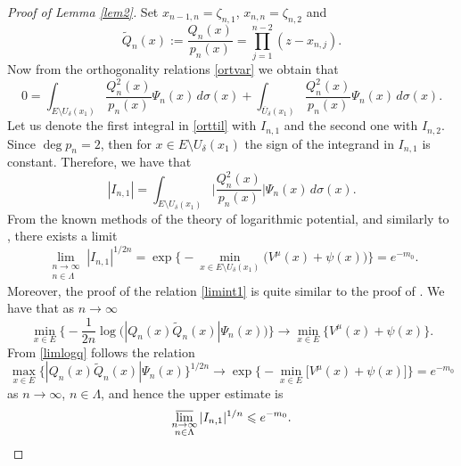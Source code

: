 \documentclass[11pt, a4paper, twoside]{article}
\let\leq\leqslant
\let\myt\widetilde
\let\myo\overline
\def\mdeg{\operatorname{deg}}
\theoremstyle{plain}
\theoremstyle{definition}
\begin{document}
\begin{proof}[Proof of Lemma \ref{lem2}]
Set $x_{n-1,n}=\zeta_{n,1}$, $x_{n,n}=\zeta_{n,2}$ and
\begin{equation}
\myt{Q}_n(x):=\frac{Q_{n}(x)}{p_n(x)}=\prod_{j=1}^{n-2}(z-x_{n,j}).
\label{qtilde}
\end{equation}
Now from the orthogonality relations \eqref{ortvar} we obtain that
\begin{equation}
0=\int_{E\setminus{U_\delta(x_1)}}
\frac{Q_{n}^2(x)}{p_n(x)}\Psi_n(x)\,d\sigma(x)
+\int_{\myo{U}_\delta(x_1)}
\frac{Q_{n}^2(x)}{p_n(x)}\Psi_n(x)\,d\sigma(x).
\label{orttil}
\end{equation}
Let us denote the first integral in \eqref{orttil} with $I_{n,1}$ and the second one with $I_{n,2}$. Since $\mdeg{p_n}=2$, then for $x\in E\setminus{U_\delta(x_1)}$ the sign of  the integrand in $I_{n,1}$  is constant. Therefore, we have that 
\begin{equation}
|I_{n,1}|=\int_{E\setminus{U_\delta(x_1)}}\biggl|
\frac{Q_{n}^2(x)}{p_n(x)}\biggr|\Psi_n(x)\,d\sigma(x).
\label{ortint1}
\end{equation}
From the known methods of the theory of logarithmic potential, and similarly to \cite[Lemma 7]{GoRa87}, there exists a limit 
\begin{equation}
\lim_{\substack{n\to\infty\\n\in\Lambda}} |I_{n,1}|^{1/2n}
=\exp\biggl\{
-\min_{x\in E\setminus{U_\delta(x_1)}}\bigl(V^\mu(x)+\psi(x)
\bigr)\biggr\}
=e^{-m_0}.
\label{limint1}
\end{equation}
Moreover, the proof of the relation \eqref{limint1} is quite similar  to the proof of \cite[Lemma 7]{GoRa87}. We have that as $n\to\infty$
\begin{equation}
\min_{x\in E}\biggl\{-\frac1{2n}
\log\bigl(
|Q_{n}(x)\myt{Q}_n(x)|\Psi_n(x)\bigr)\biggr\}
\to\min_{x\in E} \bigl\{V^\mu(x)+\psi(x)\bigr\}.
\label{limlogq}
\end{equation}
From \eqref{limlogq} follows the relation
\begin{equation}
\max_{x\in E}\bigl\{|Q_{n}(x)\myt{Q}_n(x)|\Psi_n(x)
\bigr\}^{1/2n}\to\exp\bigl\{-\min_{x\in E}\bigl[V^\mu(x)+\psi(x)\bigr]\bigr\}=e^{-m_0}
\label{limqpsi}
\end{equation}
as $n\to\infty$, $n\in\Lambda$, and hence the upper estimate is
\begin{equation}
\varlimsup_{\substack{n\to\infty\\n\in\Lambda}} |I_{n,1}|^{1/n}
\leq e^{-m_0}.
\label{upesti1}
\end{equation}


\end{proof}
\end{document}
